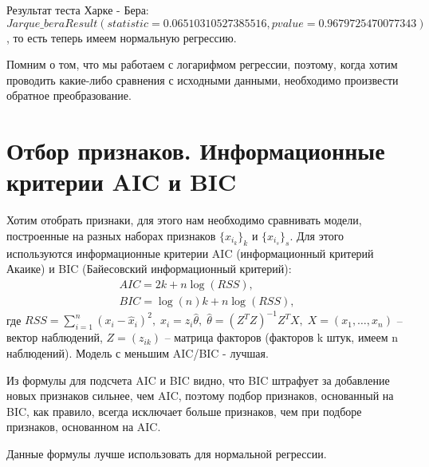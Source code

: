 	Результат теста Харке - Бера: $ Jarque\_beraResult(statistic=0.06510310527385516, pvalue=0.9679725470077343) $, то есть теперь имеем нормальную регрессию.

\begin{remark}
	Помним о том, что мы работаем с логарифмом регрессии, поэтому, когда хотим проводить какие-либо сравнения с исходными данными, необходимо произвести обратное преобразование.
\end{remark}

\section{Отбор признаков. Информационные критерии AIC и BIC}\label{cha:linreg2/sec:otbor+aic+bic}

 
 	Хотим отобрать признаки, для этого нам необходимо сравнивать модели, построенные на разных наборах признаков $ \lbrace x_{i_k} \rbrace_k $ и $ \lbrace x_{i_s} \rbrace_s $. Для этого используются информационные критерии AIC (информационный критерий Акаике) и BIC (Байесовский информационный критерий):
$$\begin{gathered}
  AIC = 2k + n\log(RSS) ,\\
  BIC = \log(n)k + n\log(RSS),
\end{gathered}$$
	где $ RSS = \sum\limits_{i = 1}^n (x_i - \hat{x}_i)^2, \;  \hat{x}_i = z_i\hat{\theta}, \; \hat{\theta} = (Z^TZ)^{-1}Z^TX, \; X = (x_1, \ldots, x_n)$  -- вектор наблюдений, $ Z = (z_{ik}) $ -- матрица факторов (факторов k штук, имеем n наблюдений). Модель с меньшим AIC/BIC - лучшая.
	
\begin{remark}
	Из формулы для подсчета AIC и BIC видно, что BIC штрафует за добавление новых признаков сильнее, чем AIC, поэтому подбор признаков, основанный на BIC, как правило, всегда исключает больше признаков, чем при подборе признаков, основанном на AIC.
\end{remark}

\begin{remark}
	Данные формулы лучше использовать для нормальной регрессии.
\end{remark}
	
